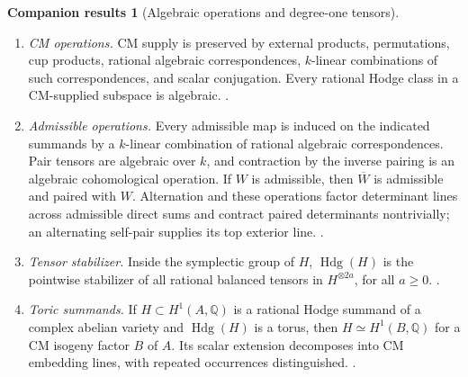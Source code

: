\documentclass[11pt]{article}
\newcommand{\Q}{\mathbb Q}
\theoremstyle{plain}
\theoremstyle{definition}
\newtheorem{companionresults}[theorem]{Companion results}
\theoremstyle{remark}
\numberwithin{equation}{section}
\begin{document}
\begin{companionresults}[Algebraic operations and degree-one tensors]
\label{comp:tools}
\leavevmode
\begin{enumerate}[label=\textup{(\roman*)}]
\item \emph{CM operations.}  CM supply is preserved by external
products, permutations, cup products, rational algebraic
correspondences, \(k\)-linear combinations of such correspondences,
and scalar conjugation.  Every rational Hodge class in a CM-supplied
subspace is algebraic.
\cite[Lemma~2.1]{OpenAIAbelianPowers}.

\item \emph{Admissible operations.}  Every admissible map is induced on
the indicated summands by a \(k\)-linear combination of rational
algebraic correspondences.  Pair tensors are algebraic over \(k\), and
contraction by the inverse pairing is an algebraic cohomological
operation.  If \(W\) is admissible, then \(\overline W\) is admissible
and paired with \(W\).  Alternation and these operations factor
determinant lines across admissible direct sums and contract paired
determinants nontrivially; an alternating self-pair supplies its top
exterior line.
\cite[Lemma~2.2 and its determinant consequences]{OpenAIAbelianPowers}.

\item \emph{Tensor stabilizer.}  Inside the symplectic group of \(H\),
\(\operatorname{Hdg}(H)\) is the pointwise stabilizer of all rational
balanced tensors in \(H^{\otimes 2a}\), for all \(a\geq0\).
\cite[Lemma~2.3]{OpenAIAbelianPowers}.

\item \emph{Toric summands.}  If \(H\subset H^1(A,\Q)\) is a rational
Hodge summand of a complex abelian variety and \(\operatorname{Hdg}(H)\)
is a torus, then \(H\simeq H^1(B,\Q)\) for a CM isogeny factor \(B\) of
\(A\).  Its scalar extension decomposes into CM embedding lines, with
repeated occurrences distinguished.
\cite[Lemma~2.4]{OpenAIAbelianPowers}.
\end{enumerate}
\end{companionresults}
\end{document}

